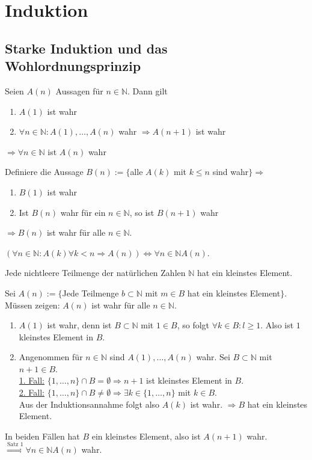 \documentclass[../ana1.tex]{subfiles}
\begin{document}
\setcounter{section}{4}
\section{Induktion}
\subsection{Starke Induktion und das Wohlordnungsprinzip}
\begin{satz}
	Seien $A(n)$ Aussagen für $n\in\mathbb{N}$. Dann gilt
	\begin{enumerate}
		\item $A(1)$ ist wahr
		\item $\forall n\in\mathbb{N}: A(1), \ldots, A(n)$ wahr $\Rightarrow A(n+1)$ ist wahr
	\end{enumerate}
	$\Rightarrow \forall n\in\mathbb{N}$ ist $A(n)$ wahr
\end{satz}
\begin{bew}
	Definiere die Aussage $B(n) := \{$alle $A(k)$ mit $k\leq n$ sind wahr$\}\Rightarrow$
	\begin{enumerate}
		\item $B(1)$ ist wahr
		\item Ist $B(n)$ wahr für ein $n\in\mathbb{N}$, so ist $B(n+1)$ wahr
	\end{enumerate}
	$\Rightarrow B(n)$ ist wahr für alle $n\in\mathbb{N}$.
\end{bew}
\begin{bem}
	$(\forall n\in\mathbb{N}:A(k) \forall k<n \Rightarrow A(n)) \Leftrightarrow \forall n\in\mathbb{N} A(n)$.
\end{bem}
\begin{satz}
	Jede nichtleere Teilmenge der natürlichen Zahlen $\mathbb{N}$ hat ein kleinstes Element.
\end{satz}
\begin{bew}
	Sei $A(n):= \{$Jede Teilmenge $b\subset\mathbb{N}$ mit $m\in B$ hat ein kleinstes Element$\}$.\\
	Müssen zeigen: $A(n)$ ist wahr für alle $n\in\mathbb{N}$.
	\begin{enumerate}
		\item $A(1)$ ist wahr, denn ist $B\subset \mathbb{N}$ mit $1\in B$, so folgt $\forall k \in B: l\geq 1$. Also ist $1$ kleinstes Element in $B$.
		\item Angenommen für $n\in\mathbb{N}$ sind $A(1),\ldots,A(n)$ wahr. Sei $B\subset \mathbb{N}$ mit $n+1\in B$.\\
		      \underline{1. Fall:} $\{1,\ldots,n\}\cap B = \emptyset \Rightarrow n+1$ ist kleinstes Element in $B$.\\
		      \underline{2. Fall:} $\{1,\ldots,n\} \cap B \neq \emptyset \Rightarrow \exists k\in \{1,\ldots,n\}$ mit $k\in B$.\\
		      Aus der Induktionsannahme folgt also $A(k)$ ist wahr. $\Rightarrow B$ hat ein kleinstes Element.
	\end{enumerate}
	In beiden Fällen hat $B$ ein kleinstes Element, also ist $A(n+1)$ wahr.\\
	$\overset{\text{Satz 1}}{\Rightarrow} \forall n\in \mathbb{N} A(n)$ wahr.
\end{bew}
\end{document}
